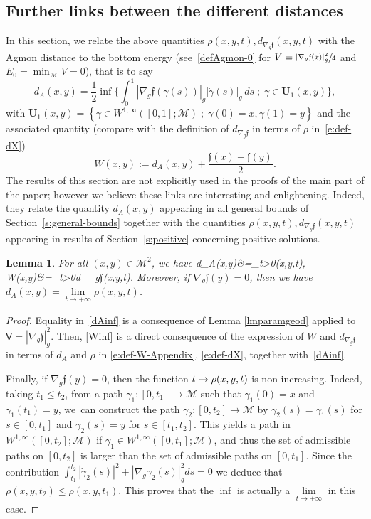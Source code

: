 \documentclass[11pt]{article}
\numberwithin{equation}{section}
\newcommand\mto{\mathchoice{\longmapsto}{\mapsto}{\mapsto}{\mapsto}}
\newcommand{\sep}{\;;\;}
\newtheorem{lemma}{Lemma}[section]
\theoremstyle{definition}
\newcommand{\M}{\ensuremath{\mathcal M}}
\newcommand{\f}{\ensuremath{\mathfrak{f}}}
\def\baln#1\naln{\begin{align}#1\end{align}}
\newcommand\bnp{\begin{proof}}
\newcommand\enp{\end{proof}}
\newcommand\nablag{\nabla_{g}}
\begin{document}
\subsection{Further links between the different distances}
\label{s:app-further-links}
In this section, we relate the above quantities $\rho(x,y,t), d_{\nablag \f}(x,y,t)$ with the Agmon distance to the bottom energy (see~\ref{defAgmon-0} for $V = \sfrac{| \nabla_g \f(x)|_g^2}{4}$ and $E_0 = \min_\M V = 0$), that is to say
\begin{equation}
\label{e:def-dA-Appendix}
d_{A}(x,y) = \frac12 \inf \biggl\{ \int_0^1|\nabla_g \f(\gamma(s))|_g |\dot{\gamma}(s)|_g\, ds\sep \gamma \in \mathbf{U}_1(x,y) \biggr\},
\end{equation}
with $\mathbf{U}_1(x,y)= \left\{ \gamma \in W^{1,\infty} ([0,1] ; \M )\sep\gamma(0)=x, \gamma(1)= y \right\}$ and the associated quantity (compare with the definition of $d_{\nablag \f}$ in terms of $\rho$ in~\eqref{e:def-dX})\enlargethispage{-\baselineskip}%
\begin{equation}
\label{e:def-W-Appendix}
W(x,y) := d_{A}(x,y)+\frac{\f(x)-\f(y)}{2}.
\end{equation}
The results of this section are not explicitly used in the proofs of the main part of the paper; however we believe these links are interesting and enlightening. Indeed, they relate the quantity $d_{A}(x,y)$ appearing in all general bounds of Section~\ref{s:general-bounds} together with the quantities $\rho(x,y,t), d_{\nablag \f}(x,y,t)$ appearing in results of Section~\ref{s:positive} concerning positive solutions.
\begin{lemma}
For all $(x,y)\in \M^2$, we have
\baln
\label{dAinf}
d_{A}(x,y)&=\inf_{t>0}\rho(x,y,t),\\
\label{Winf}W(x,y)&=\inf_{t>0}d_{\nablag \f}(x,y,t).
\naln
Moreover, if $\nabla_g\f(y)=0$, then we have $d_{A}(x,y) =\underset{t\to+\infty}{\lim}\rho(x,y,t)$.

\end{lemma}
\bnp
Equality in~\eqref{dAinf} is a consequence of Lemma \ref{lmparamgeod} applied to $\mathsf{V}=|\nabla_g\f|_g^2$.
Then, \eqref{Winf} is a direct consequence of the expression of $W$ and $d_{\nablag \f}$ in terms of $d_A$ and $\rho$ in \eqref{e:def-W-Appendix}, \eqref{e:def-dX}, together with~\eqref{dAinf}.

Finally, if $\nabla_g\f(y)=0$, then the function $t\mto \rho(x,y,t)$ is non-increasing. Indeed, taking $t_1\leq t_2$, from a path $\gamma_1: [0,t_1]\to \M$ such that $\gamma_1(0)=x$ and $\gamma_1(t_1)=y$, we~can construct the path $\gamma_2:[0,t_2]\to \M$ by $\gamma_2(s)=\gamma_1(s)$ for $s\in [0,t_1]$ and \hbox{$\gamma_2(s) = y$} for $s\in[t_1,t_2]$. This yields a path in $W^{1,\infty}([0,t_2];\M)$ if $\gamma_1 \in W^{1,\infty}([0,t_1];\M)$, and thus the set of admissible paths on $[0,t_2]$ is larger than the set of admissible paths on $[0,t_1]$. Since the contribution $\int_{t_1}^{t_2} |\dot{\gamma}_2(s)|^2 + |\nabla_g\gamma_2(s)|_g^2 ds= 0$ we deduce that $\rho(x,y,t_2)\leq \rho(x,y,t_1)$. This proves that the $\inf$ is actually a $\underset{t\to+\infty}{\lim}$ in this case.
\enp
\end{document}
